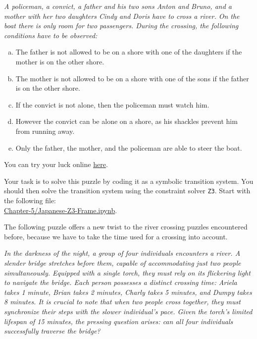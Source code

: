 \begin{minipage}{0.95\linewidth}
{\sl
  A policeman, a convict, a father and his two sons Anton and Bruno, and a mother with her two daughters Cindy and Doris have to cross a river. On the boat there is only room for two passengers.
During the crossing, the following conditions have to be observed:
\begin{enumerate}[(a)]
\item The father is not allowed to be on a shore with one of the daughters if the mother is on the other shore.
\item The mother is not allowed to be on a shore with one of the sons if the father is on the other shore.
\item If the convict is not alone, then the policeman must watch him.
\item However the convict can be alone on a shore, as his shackles prevent him from running away.
\item Only the father, the mother, and the policeman are able to steer the boat.
\end{enumerate}}
\end{minipage}
\vspace*{0.2cm}

\noindent
You can try your luck online \href{https://flashmuseum.org/iq-%E9%81%8E%E6%B2%B3%E9%81%8A%E6%88%B2/}{here}.

\noindent
Your task is to solve this puzzle by coding it as a symbolic transition system.  You should then solve the
transition system using the constraint solver \texttt{Z3}.
Start with the following file:
\\[0.2cm]
\hspace*{1.3cm}
\href{https://github.com/karlstroetmann/Logic/blob/master/TypeScript/Chapter-5/Japanese-Z3-Frame.ipynb}{Chapter-5/Japanese-Z3-Frame.ipynb}.
\eox

\exerciseEng
The following puzzle offers a new twist to the river crossing puzzles encountered before, because we have to
take the time used for a crossing into account.

\begin{minipage}{0.95\linewidth}
  {\sl
    In the darkness of the night, a group of four individuals encounters a river. A slender bridge stretches
    before them, capable of accommodating just two people simultaneously. Equipped with a single torch, they
    must rely on its flickering light to navigate the bridge. Each person possesses a distinct crossing time:
    Ariela takes 1 minute, Brian takes 2 minutes, Charly takes 5 minutes, and Dumpy takes 8 minutes. It is
    crucial to note that when two people cross together, they must synchronize their steps with the slower
    individual's pace. Given the torch's limited lifespan of 15 minutes, the pressing question arises: can all
    four individuals successfully traverse the bridge? 
  }
\end{minipage}

